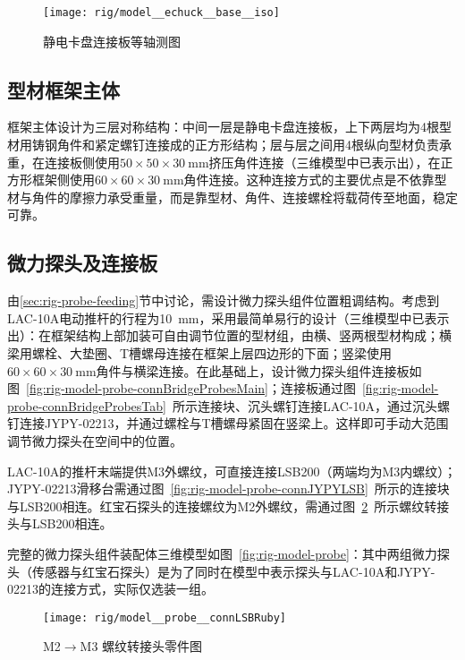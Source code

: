 \begin{figure}[thb]
\centering
\texttt{[image: rig/model\_\_echuck\_\_base\_\_iso]}
\caption{静电卡盘连接板等轴测图}
\label{fig:rig-model-echuck-base-iso}
\end{figure}


\subsection{型材框架主体}\label{sec:rig-model-frame}

框架主体设计为三层对称结构：中间一层是静电卡盘连接板，上下两层均为4根型材用铸钢角件和紧定螺钉连接成的正方形结构；层与层之间用4根纵向型材负责承重，在连接板侧使用$\num{50}\times\num{50}\times\SI{30}{\mm}$挤压角件连接（三维模型中已表示出），在正方形框架侧使用$\num{60}\times\num{60}\times\SI{30}{\mm}$角件连接。这种连接方式的主要优点是不依靠型材与角件的摩擦力承受重量，而是靠型材、角件、连接螺栓将载荷传至地面，稳定可靠。


\subsection{微力探头及连接板}\label{sec:rig-model-probe}

由\ref{sec:rig-probe-feeding}节中讨论，需设计微力探头组件位置粗调结构。考虑到LAC-10A电动推杆的行程为\SI{10}{\mm}，采用最简单易行的设计（三维模型中已表示出）：在框架结构上部加装可自由调节位置的型材组，由横、竖两根型材构成；横梁用螺栓、大垫圈、T槽螺母连接在框架上层四边形的下面；竖梁使用$\num{60}\times\num{60}\times\SI{30}{\mm}$角件与横梁连接。在此基础上，设计微力探头组件连接板如图~\ref{fig:rig-model-probe-connBridgeProbesMain}；连接板通过图~\ref{fig:rig-model-probe-connBridgeProbesTab}~所示连接块、沉头螺钉连接LAC-10A，通过沉头螺钉连接JYPY-02213，并通过螺栓与T槽螺母紧固在竖梁上。这样即可手动大范围调节微力探头在空间中的位置。

LAC-10A的推杆末端提供M3外螺纹，可直接连接LSB200（两端均为M3内螺纹）；JYPY-02213滑移台需通过图~\ref{fig:rig-model-probe-connJYPYLSB}~所示的连接块与LSB200相连。红宝石探头的连接螺纹为M2外螺纹，需通过图~\ref{fig:rig-model-probe-connLSBRuby}~所示螺纹转接头与LSB200相连。

完整的微力探头组件装配体三维模型如图~\ref{fig:rig-model-probe}：其中两组微力探头（传感器与红宝石探头）是为了同时在模型中表示探头与LAC-10A和JYPY-02213的连接方式，实际仅选装一组。

\begin{figure}[thb]
\centering
\texttt{[image: rig/model\_\_probe\_\_connLSBRuby]}
\caption{M2$\to$M3 螺纹转接头零件图}
\label{fig:rig-model-probe-connLSBRuby}
\end{figure}

